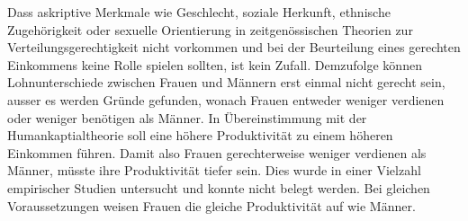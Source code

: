 \documentclass[a4paper,12pt]{article}
\renewcommand{\baselinestretch}{1.1}
\newif\ifcomments
\newcommand{\comment}[1]{%
    \ifcomments\marginpar{\renewcommand{\baselinestretch}{1}\tiny\hspace*{-1.1em}\colorbox{gray!20}%
    {\textcolor{red}{\parbox[t]{.9in}{\raggedright #1}}}}\fi}
\begin{document}
Dass askriptive Merkmale wie Geschlecht, soziale Herkunft, ethnische
Zugehörigkeit oder sexuelle Orientierung in zeitgenössischen Theorien zur
Verteilungsgerechtigkeit nicht vorkommen und bei der Beurteilung eines
gerechten Einkommens keine Rolle spielen sollten, ist kein Zufall.
\comment{(ggfs. Begründung mit Rawls, „Schleier des Nichtwissens“ oder so;
Rawls 1979)} Demzufolge können Lohnunterschiede zwischen Frauen und
Männern erst einmal nicht gerecht sein, ausser es werden Gründe gefunden,
wonach Frauen entweder weniger verdienen oder weniger benötigen als Männer. In
Übereinstimmung mit der Humankaptialtheorie
\citep{Becker-1975,Mincer-Polachek-1974} soll eine höhere Produktivität zu
einem höheren Einkommen führen. Damit also Frauen gerechterweise weniger
verdienen als Männer, müsste ihre Produktivität tiefer sein. Dies wurde in
einer Vielzahl empirischer Studien \comment{Referenz?} untersucht und konnte nicht belegt werden.
Bei gleichen Voraussetzungen weisen Frauen die gleiche Produktivität auf wie
Männer.
\end{document}
